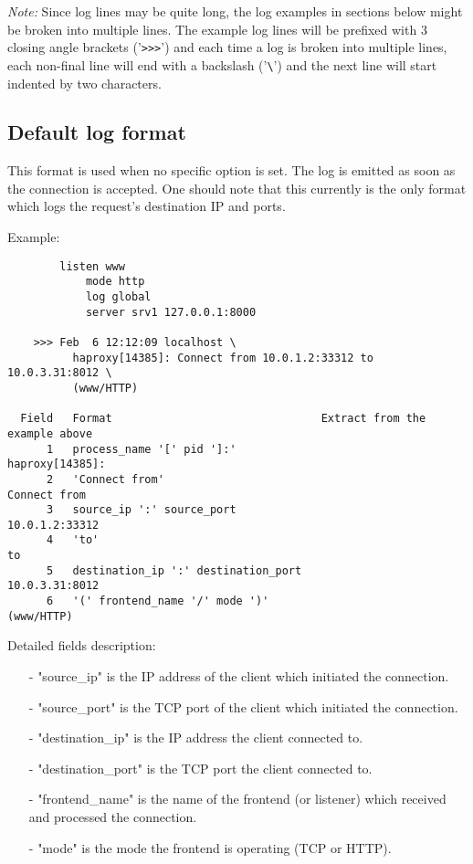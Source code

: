 \emph{Note:} Since log lines may be quite long, the log examples in sections below
       might be broken into multiple lines. The example log lines will be
       prefixed with 3 closing angle brackets ('\verb|>>>|') and each time a log is
       broken into multiple lines, each non-final line will end with a
       backslash ('\verb|\|') and the next line will start indented by two characters.


\subsection{Default log format}

This format is used when no specific option is set. The log is emitted as soon
as the connection is accepted. One should note that this currently is the only
format which logs the request's destination IP and ports.

Example:
\begin{verbatim}
        listen www
            mode http
            log global
            server srv1 127.0.0.1:8000

    >>> Feb  6 12:12:09 localhost \
          haproxy[14385]: Connect from 10.0.1.2:33312 to 10.0.3.31:8012 \
          (www/HTTP)

  Field   Format                                Extract from the example above
      1   process_name '[' pid ']:'                            haproxy[14385]:
      2   'Connect from'                                          Connect from
      3   source_ip ':' source_port                             10.0.1.2:33312
      4   'to'                                                              to
      5   destination_ip ':' destination_port                   10.0.3.31:8012
      6   '(' frontend_name '/' mode ')'                            (www/HTTP)
\end{verbatim}

Detailed fields description:
\begin{itemize}
\item[-] "source\_ip" is the IP address of the client which initiated the connection.
\item[-] "source\_port" is the TCP port of the client which initiated the connection.
\item[-] "destination\_ip" is the IP address the client connected to.
\item[-] "destination\_port" is the TCP port the client connected to.
\item[-] "frontend\_name" is the name of the frontend (or listener) which received
    and processed the connection.
\item[-] "mode" is the mode the frontend is operating (TCP or HTTP).
\end{itemize}

